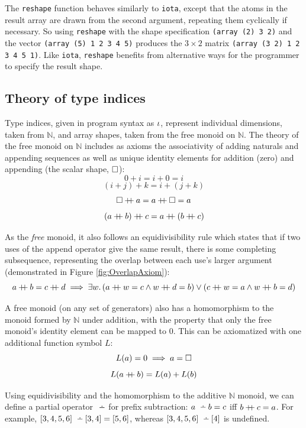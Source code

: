 \FigIotaVariants

The {\tt reshape} function behaves similarly to {\tt iota},
except that the atoms in the result array
are drawn from the second argument,
repeating them cyclically if necessary.
So using {\tt reshape}
with the shape specification {\tt (array (2) 3 2)}
and the vector {\tt (array (5) 1 2 3 4 5)}
produces the $3 \times 2$ matrix {\tt (array (3 2) 1 2 3 4 5 1)}.
Like {\tt iota},
{\tt reshape} benefits from alternative ways
for the programmer to specify the result shape.

\subsection{Theory of type indices} \label{IdxTheoryProse}
Type indices, given in program syntax as $\mathit{\iota}$,
represent individual dimensions, taken from $\mathbb{N}$,
and array shapes, taken from the free monoid on $\mathbb{N}$.
The theory of the free monoid on $\mathbb{N}$ includes as axioms
the associativity of adding naturals and appending sequences
as well as unique identity elements for addition (zero)
and appending (the scalar shape, $\square$):
\[0 + i = i + 0 = i\]
\[(i + j) + k = i + (j + k)\]
\[\square \mathbin{+\mkern-7mu+} a = a \mathbin{+\mkern-7mu+} \square = a\]
\[(a \mathbin{+\mkern-7mu+} b) \mathbin{+\mkern-7mu+} c = a \mathbin{+\mkern-7mu+} (b \mathbin{+\mkern-7mu+} c)\]

As the \emph{free} monoid,
it also follows an equidivisibility rule which states that
if two uses of the append operator give the same result,
there is some completing subsequence,
representing the overlap between each use's larger argument
(demonstrated in Figure \ref{fig:OverlapAxiom}):
\[ a \thappend b = c \thappend d \implies
\exists w . \left( a \thappend w = c\wedge w \thappend d = b \right)
\vee \left( c \thappend w = a \wedge w \thappend b = d \right) \]

\FigOverlapAxiom

A free monoid (on any set of generators) also has a homomorphism to
the monoid formed by $\mathbb{N}$ under addition,
with the property that only the free monoid's identity element
can be mapped to 0.
This can be axiomatized with one additional function symbol $L$:
\[L(a) = 0 \implies a = \square \]
\[L(a \mathbin{+\mkern-7mu+} b) = L(a) + L(b) \]

Using equidivisibility and the homomorphism to the additive $\mathbb{N}$ monoid,
we can define a partial operator $\thmonus$ for prefix subtraction:
$a \thmonus b = c$ iff $b \mathbin{+\mkern-7mu+} c = a$.
For example, $[3,4,5,6] \thmonus [3,4] = [5,6]$,
whereas $[3,4,5,6] \thmonus [4]$ is undefined.

